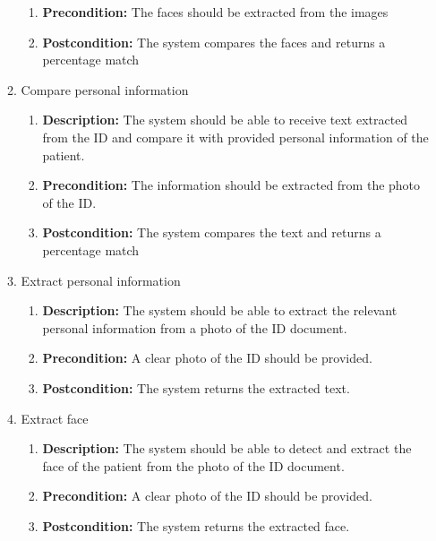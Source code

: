 \documentclass{article}
\begin{document}
\begin{enumerate}
\begin{enumerate}
\begin{enumerate}
					\item \textbf{Precondition:} The faces should be extracted from the images
					\item \textbf{Postcondition:} The system compares the faces and returns a percentage match
				\end{enumerate}
				\item Compare personal information
				\begin{enumerate}
					\item \textbf{Description:} The system should be able to receive text extracted from the ID and compare it with provided personal information of the patient.
					\item \textbf{Precondition:} The information should be extracted from the photo of the ID.
					\item \textbf{Postcondition:} The system compares the text and returns a percentage match
				\end{enumerate}
				\item Extract personal information
				\begin{enumerate}
					\item \textbf{Description:} The system should be able to extract the relevant personal information from a photo of the ID document.
					\item \textbf{Precondition:} A clear photo of the ID should be provided.
					\item \textbf{Postcondition:} The system returns the extracted text.
				\end{enumerate}
				\item Extract face
				\begin{enumerate}
					\item \textbf{Description:} The system should be able to detect and extract the face of the patient from the photo of the ID document.
					\item \textbf{Precondition:} A clear photo of the ID should be provided.
					\item \textbf{Postcondition:} The system returns the extracted face.
				\end{enumerate}
			\end{enumerate}
		\end{enumerate}
\end{document}
